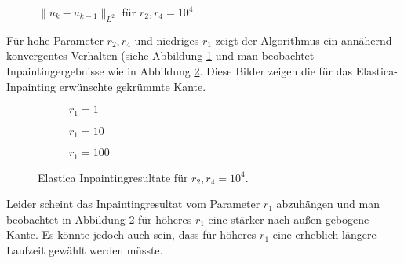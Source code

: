 \documentclass{mythesis}
\begin{document}
\begin{figure}[ht]
    \centering
    \caption{$\|u_k - u_{k-1}\|_{L^2}$ für $r_2, r_4 = 10^4$.}
    \label{fig:num_eeparam_conv}
\end{figure}

Für hohe Parameter $r_2, r_4$ und niedriges $r_1$ zeigt der Algorithmus ein annähernd konvergentes Verhalten (siehe Abbildung \ref{fig:num_eeparam_conv} und man beobachtet Inpaintingergebnisse wie in Abbildung \ref{fig:num_eeparam_png}.
Diese Bilder zeigen die für das Elastica-Inpainting erwünschte gekrümmte Kante.

\begin{figure}[ht]
    \centering
    \begin{subfigure}{0.2\textwidth}
	\centering
	\caption{$r_1 = 1$}
    \end{subfigure}%
    \begin{subfigure}{0.2\textwidth}
	\centering
	\caption{$r_1 = 10$}
    \end{subfigure}%
    \begin{subfigure}{0.2\textwidth}
	\centering
	\caption{$r_1 = 100$}
    \end{subfigure}%
    \caption{Elastica Inpaintingresultate für $r_2, r_4 = 10^4$.}
    \label{fig:num_eeparam_png}
\end{figure}

Leider scheint das Inpaintingresultat vom Parameter $r_1$ abzuhängen und man beobachtet in Abbildung \ref{fig:num_eeparam_png} für höheres $r_1$ eine stärker nach außen gebogene Kante.
Es könnte jedoch auch sein, dass für höheres $r_1$ eine erheblich längere Laufzeit gewählt werden müsste.
\end{document}
